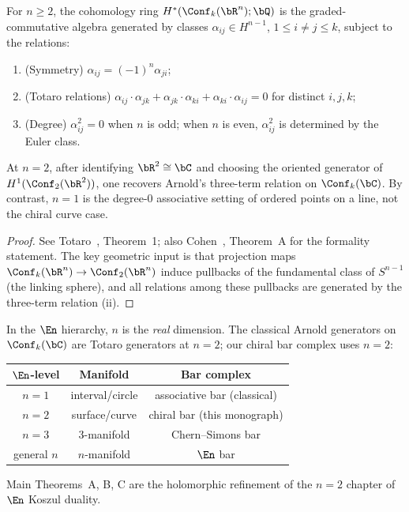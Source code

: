 \begin{theorem}
\label{thm:totaro-presentation}
For $n \geq 2$, the cohomology ring
$H^*(\Conf_k(\bR^n); \bQ)$ is the graded-commutative algebra
generated by classes $\alpha_{ij} \in H^{n-1}$,
$1 \leq i \neq j \leq k$, subject to the relations:
\begin{enumerate}[label=\textup{(\roman*)}]
\item \textup{(Symmetry)}\quad
 $\alpha_{ij} = (-1)^n \alpha_{ji}$;
\item \textup{(Totaro relations)}\quad
 $\alpha_{ij} \cdot \alpha_{jk}
 + \alpha_{jk} \cdot \alpha_{ki}
 + \alpha_{ki} \cdot \alpha_{ij} = 0$
 for distinct $i, j, k$;
\item \textup{(Degree)}\quad
 $\alpha_{ij}^2 = 0$ when $n$ is odd;
 when $n$ is even, $\alpha_{ij}^2$ is determined by the Euler class.
\end{enumerate}
At $n = 2$, after identifying $\bR^2 \cong \bC$ and choosing the
oriented generator of $H^1(\Conf_2(\bR^2))$, one recovers Arnold's
three-term relation on $\Conf_k(\bC)$. By contrast, $n = 1$ is the
degree-$0$ associative setting of ordered points on a line, not the
chiral curve case.
\end{theorem}

\begin{proof}
See Totaro~\cite{Totaro96}, Theorem~1; also
Cohen~\cite{Coh76}, Theorem~A for the formality statement.
The key geometric input is that projection maps
$\Conf_k(\bR^n) \to \Conf_2(\bR^n)$ induce pullbacks of the
fundamental class of $S^{n-1}$ (the linking sphere), and all
relations among these pullbacks are generated by the three-term
relation (ii).
\end{proof}

\begin{remark}[Arnold as Totaro at \texorpdfstring{$n = 2$}{n = 2}]
\label{rem:arnold-totaro}
In the $\En$ hierarchy, $n$ is the \emph{real} dimension.
The classical Arnold generators on $\Conf_k(\bC)$ are Totaro
generators at $n = 2$; our chiral bar complex uses $n = 2$:
\begin{center}
\begin{tabular}{ccc}
$\En$-level & Manifold & Bar complex \\
\hline
$n = 1$ & interval/circle & associative bar (classical) \\
$n = 2$ & surface/curve & chiral bar (this monograph) \\
$n = 3$ & $3$-manifold & Chern--Simons bar \\
general $n$ & $n$-manifold & $\En$ bar
\end{tabular}
\end{center}
Main Theorems~A, B, C are the holomorphic refinement of the
$n = 2$ chapter of $\En$ Koszul duality.
\end{remark}


